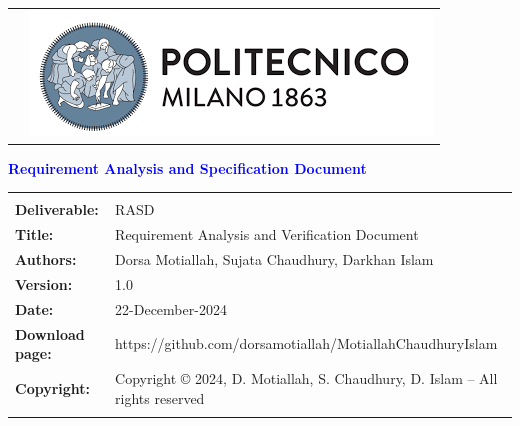 \documentclass [11pt,twoside]{article}
\date{}
\begin{document}

\begin{titlepage}



\begin{table}[t!]
\centering
{}
\end{table}


\begin{flushleft}

{\textcolor{Blue}{\textbf{\Huge{Requirement Analysis and Specification
        Document}}}} \\ [1cm]

\end{flushleft}

\begin{table}[h!]
\begin{tabu} to \textwidth { X[0.3,r,p] X[0.7,l,p] }
\hline
\\
\textbf{Deliverable:} & RASD\\
\textbf{Title:} & Requirement Analysis and Verification Document \\
\textbf{Authors:} & Dorsa Motiallah, Sujata Chaudhury, Darkhan Islam \\
\textbf{Version:} & 1.0 \\ 
\textbf{Date:} & 22-December-2024 \\
\textbf{Download page:} & https://github.com/dorsamotiallah/MotiallahChaudhuryIslam \\
\textbf{Copyright:} & Copyright © 2024, D. Motiallah, S. Chaudhury, D. Islam – All rights reserved \\ \\

\hline
\end{tabu}
\end{table}

\end{titlepage}
\end{document}
